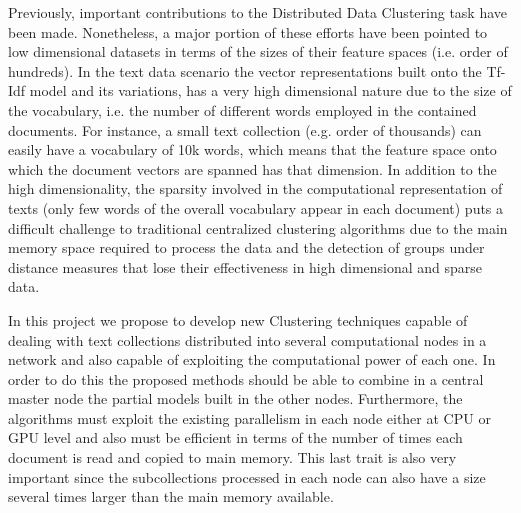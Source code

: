 \documentclass[10pt]{article}
\begin{document}
Previously, important contributions to the Distributed Data Clustering task have been made. Nonetheless, a major portion of these efforts have been pointed to low dimensional datasets in terms of the sizes of their feature spaces (i.e. order of hundreds). In the text data scenario the vector representations built onto the Tf-Idf model and its variations, has a very high dimensional nature due to the size of the vocabulary, i.e. the number of different words employed in the contained documents. For
instance, a small text collection (e.g. order of thousands) can easily have a vocabulary of 10k words, which means that the feature space onto which the document vectors are spanned has that dimension. In addition to the high dimensionality, the sparsity involved in the computational representation of texts (only few words of the overall vocabulary appear in each document) puts a difficult challenge to traditional centralized clustering algorithms due to the main memory space required to process the data and
the detection of groups under distance measures that lose their effectiveness in high dimensional and sparse data.


In this project we propose to develop new Clustering techniques capable of dealing with text collections distributed into several computational nodes in a network and also capable of exploiting the computational power of each one. In order to do this the proposed methods should be able to combine in a central master node the partial models built in the other nodes. Furthermore, the algorithms must exploit the existing parallelism in each node either at CPU or GPU level and also
must be efficient in terms of the number of times each document is read and copied to main memory. This last trait is also very important since the subcollections processed in each node can also have a size several times larger than the main memory available.
\end{document}
